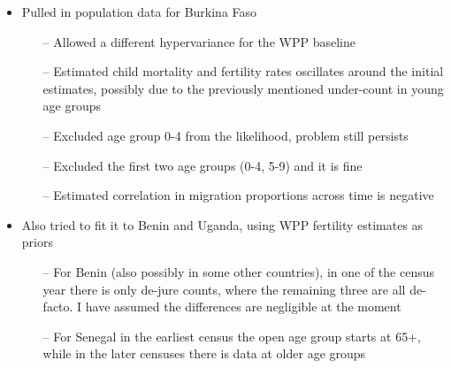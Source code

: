\documentclass[12pt,a4paper]{article}
\date{\vspace{-5ex}}
\begin{document}
\begin{itemize}
\item Pulled in population data for Burkina Faso 
\begin{itemize}
\item[--] Allowed a different hypervariance for the WPP baseline
\item[--] Estimated child mortality and fertility rates oscillates around the initial estimates, possibly due to the previously mentioned under-count in young age groups
\item[--] Excluded age group 0-4 from the likelihood, problem still persists
\item[--] Excluded the first two age groups (0-4, 5-9) and it is fine
\item[--] Estimated correlation in migration proportions across time is negative 
\end{itemize}
\item Also tried to fit it to Benin and Uganda, using WPP fertility estimates as priors 
\begin{itemize}
\item[--] For Benin (also possibly in some other countries), in one of the census year there is only de-jure counts, where the remaining three are all de-facto. I have assumed the differences are negligible at the moment
\item[--] For Senegal in the earliest census the open age group starts at 65+, while in the later censuses there is data at older age groups
\end{itemize}

\end{itemize}








\end{document}
